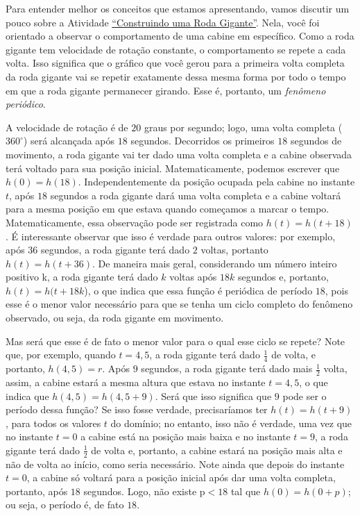 Para entender melhor os conceitos que estamos apresentando, vamos discutir um pouco sobre a Atividade \hyperref[trig-ativ1]{“Construindo uma Roda Gigante”}. Nela, você foi orientado a observar o comportamento de uma cabine em específico. Como a roda gigante tem velocidade de rotação constante, o comportamento se repete a cada volta. Isso significa que o gráfico que você gerou para a primeira volta completa da roda gigante vai se repetir exatamente dessa mesma forma por todo o tempo em que a roda gigante permanecer girando. Esse é, portanto, um \textit{fenômeno periódico}.


A velocidade de rotação é de $20$ graus por segundo; logo, uma volta completa ($360^{\circ}$) será alcançada após $18$ segundos. Decorridos os primeiros $18$ segundos de movimento, a roda gigante vai ter dado uma volta completa e a cabine observada terá voltado para sua posição inicial. Matematicamente, podemos escrever que $h(0)=h(18)$. Independentemente da posição ocupada pela cabine no instante $t$, após $18$ segundos a roda gigante dará uma volta completa e a cabine voltará para a mesma posição em que estava quando começamos a marcar o tempo. Matematicamente, essa observação pode ser registrada como  $h(t)=h(t+18)$. É interessante observar que isso é verdade para outros valores: por exemplo, após 36 segundos, a roda gigante terá dado $2$ voltas, portanto $h(t)=h(t+36)$.
De maneira mais geral, considerando um número inteiro positivo k, a roda gigante terá dado $k$ voltas após $18k$ segundos  e, portanto, $h(t)=h(t+18k$), o que indica que essa função é periódica de período $18$, pois esse é o menor valor necessário para que se tenha um ciclo completo do fenômeno observado, ou seja, da roda gigante em movimento.

Mas será que esse é de fato o menor valor para o qual esse ciclo se repete? Note que, por exemplo, quando $t=4{,}5$, a roda gigante terá dado $\frac{1}{4}$	de volta, e portanto, $h(4{,}5)=r$. Após $9$ segundos, a roda gigante terá dado mais $\frac{1}{2}$ volta, assim, a cabine estará a mesma altura que estava no instante $t=4{,}5$, o que indica que $h(4{,}5)=h(4{,}5+9)$. Será que isso significa que $9$ pode ser o período dessa função? Se isso fosse verdade, precisaríamos ter $h(t)=h(t+9)$, para todos os valores $t$ do domínio; no entanto, isso não é verdade, uma vez que no instante $t=0$ a cabine está na posição mais baixa e no instante $t=9$, a roda gigante terá dado $\frac{1}{2}$ de volta e, portanto, a cabine estará na posição mais alta e não de volta ao início, como seria necessário. Note ainda que depois do instante $t=0$, a cabine só voltará para a posição inicial após dar uma volta completa, portanto, após $18$ segundos. Logo, não existe p$<18$ tal que $h(0)=h(0+p)$; ou seja, o período é, de fato $18$.

